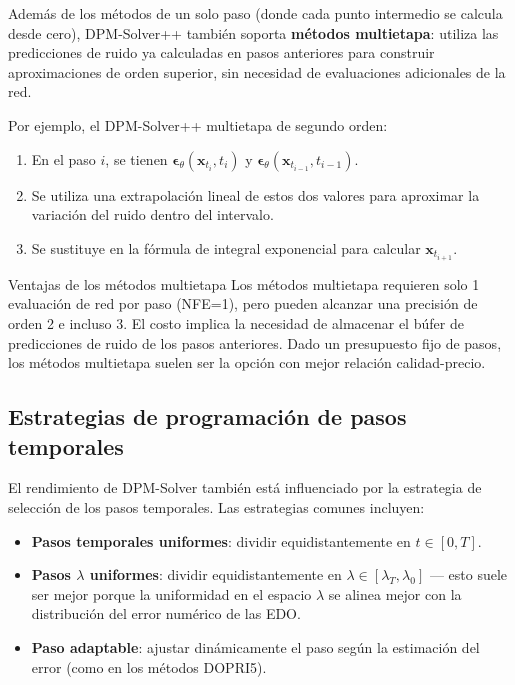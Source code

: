 Además de los métodos de un solo paso (donde cada punto intermedio se calcula desde cero), DPM-Solver++ también soporta \textbf{métodos multietapa}: utiliza las predicciones de ruido ya calculadas en pasos anteriores para construir aproximaciones de orden superior, sin necesidad de evaluaciones adicionales de la red.

Por ejemplo, el DPM-Solver++ multietapa de segundo orden:
\begin{enumerate}
    \item En el paso $i$, se tienen $\boldsymbol{\epsilon}_\theta(\mathbf{x}_{t_i}, t_i)$ y $\boldsymbol{\epsilon}_\theta(\mathbf{x}_{t_{i-1}}, t_{i-1})$.
    \item Se utiliza una extrapolación lineal de estos dos valores para aproximar la variación del ruido dentro del intervalo.
    \item Se sustituye en la fórmula de integral exponencial para calcular $\mathbf{x}_{t_{i+1}}$.
\end{enumerate}

\begin{importantbox}{Ventajas de los métodos multietapa}
Los métodos multietapa requieren solo 1 evaluación de red por paso (NFE=1), pero pueden alcanzar una precisión de orden 2 e incluso 3. El costo implica la necesidad de almacenar el búfer de predicciones de ruido de los pasos anteriores. Dado un presupuesto fijo de pasos, los métodos multietapa suelen ser la opción con mejor relación calidad-precio.
\end{importantbox}

\subsection{Estrategias de programación de pasos temporales}

El rendimiento de DPM-Solver también está influenciado por la estrategia de selección de los pasos temporales. Las estrategias comunes incluyen:

\begin{itemize}
    \item \textbf{Pasos temporales uniformes}: dividir equidistantemente en $t \in [0, T]$.
    \item \textbf{Pasos $\lambda$ uniformes}: dividir equidistantemente en $\lambda \in [\lambda_T, \lambda_0]$ — esto suele ser mejor porque la uniformidad en el espacio $\lambda$ se alinea mejor con la distribución del error numérico de las EDO.
    \item \textbf{Paso adaptable}: ajustar dinámicamente el paso según la estimación del error (como en los métodos DOPRI5).
\end{itemize}

